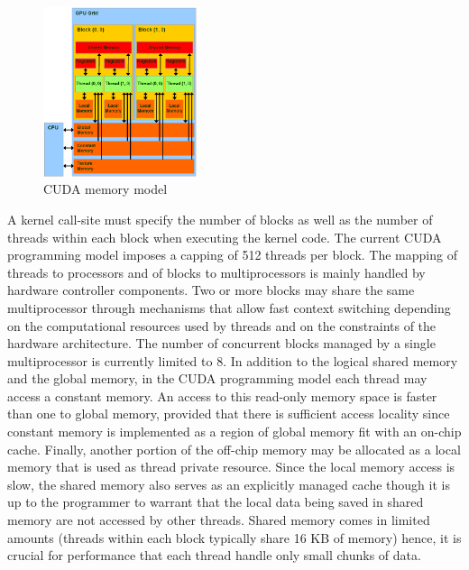 \begin{figure}[h!tp]
    \centering
     \includegraphics[width=0.4\textwidth]{./img/memModel}
\caption{CUDA memory model}\label{fig:memModel}
    \end{figure}

   A kernel call-site must specify the number of blocks as well as the number of threads within each
block when executing the kernel code. The current CUDA programming model imposes a capping of 512 threads per block.\newline
   The mapping of threads to processors and of blocks to multiprocessors is mainly handled by hardware controller components.
Two or more blocks may share the same multiprocessor through mechanisms that allow fast context switching depending on 
the computational resources used by threads and on the constraints of the hardware architecture.
The number of concurrent blocks managed by a single multiprocessor is currently limited to 8.\newline
   In addition to the logical shared memory and the global memory, in the CUDA programming model each thread may access a constant memory.
 An access to this read-only memory space is faster than one to global memory, provided that there is sufficient access locality since
constant memory is implemented as a region of global memory fit with an on-chip cache.
Finally, another portion of the off-chip memory may be allocated as a local memory that is used as thread private resource.
Since the local memory access is slow, the shared memory also serves as an explicitly managed cache though it is up to the
programmer to warrant that the local data being saved in shared memory are not accessed by other
threads. Shared memory comes in limited amounts (threads within each block typically share 16 KB of memory) hence,
it is crucial for performance that each thread handle only small chunks of data.

